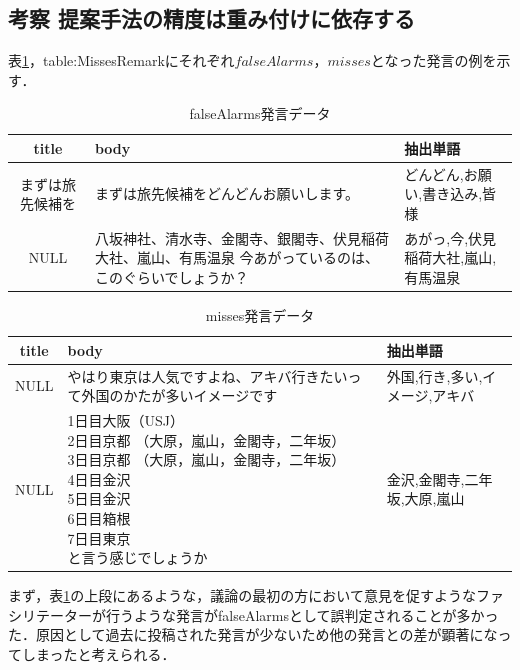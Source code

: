 \subsection*{考察 提案手法の精度は重み付けに依存する}
表\ref{table:FalseAlarmsRemark}，{table:MissesRemark}にそれぞれ$falseAlarms$，$misses$となった発言の例を示す．
\begin{table}[htbp]
  \begin{tabular}{| c |  p{6cm} | p{5cm} |} \hline
     title & body  & 抽出単語 \\ \hline
     まずは旅先候補を&まずは旅先候補をどんどんお願いします。&どんどん,お願い,書き込み,皆様\\ \hline
     NULL &八坂神社、清水寺、金閣寺、銀閣寺、伏見稲荷大社、嵐山、有馬温泉 今あがっているのは、このぐらいでしょうか？&あがっ,今,伏見稲荷大社,嵐山,有馬温泉\\
     \hline
  \end{tabular}
  \caption{falseAlarms発言データ} \label{table:FalseAlarmsRemark}
\end{table}
\begin{table}[htbp]
\begin{center}
  \begin{tabular}{| c | p{8cm} | p{6cm} |} \hline
     title & body & 抽出単語 \\ \hline
     NULL&やはり東京は人気ですよね、アキバ行きたいって外国のかたが多いイメージです & 外国,行き,多い,イメージ,アキバ \\ \hline
     NULL &  \shortstack{1日目大阪（USJ）\\
 2日目京都 （大原，嵐山，金閣寺，二年坂）\\
 3日目京都 （大原，嵐山，金閣寺，二年坂）\\
 4日目金沢\\
 5日目金沢\\
 6日目箱根\\
 7日目東京\\
 と言う感じでしょうか} & 金沢,金閣寺,二年坂,大原,嵐山\\
     \hline
  \end{tabular}
  \caption{misses発言データ} \label{table:MissesRemark}
  \end{center}
\end{table}
まず，表\ref{table:FalseAlarmsRemark}の上段にあるような，議論の最初の方において意見を促すようなファシリテーターが行うような発言がfalseAlarmsとして誤判定されることが多かった．原因として過去に投稿された発言が少ないため他の発言との差が顕著になってしまったと考えられる．
\\
